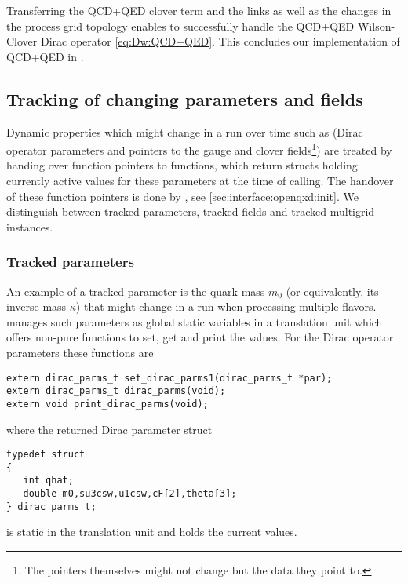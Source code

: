 Transferring the QCD+QED clover term and the  links as well as the changes in the process grid topology enables \quda to successfully handle the QCD+QED Wilson-Clover Dirac operator \cref{eq:Dw:QCD+QED}.
This concludes our implementation of QCD+QED in \quda.

\subsection{Tracking of changing parameters and fields}
\label{sec:interface:track_params}


Dynamic properties which might change in a run over time such as
  (Dirac operator parameters and
  pointers to the gauge and clover fields\footnote{The pointers themselves might not change but the data they point to.})
are treated by handing over function pointers to functions, which return structs holding currently active values for these parameters at the time of calling.
The handover of these function pointers is done by , see \cref{sec:interface:openqxd:init}.
We distinguish between tracked parameters, tracked fields and tracked multigrid instances.

\subsubsection{Tracked parameters}

An example of a tracked parameter is the quark mass $m_0$ (or equivalently, its inverse mass $\kappa$) that might change in a run when processing multiple flavors. \Openqxd manages such parameters as global static variables in a translation unit which offers non-pure functions to set, get and print the values. For the Dirac operator parameters these functions are
\begin{verbatim}
extern dirac_parms_t set_dirac_parms1(dirac_parms_t *par);
extern dirac_parms_t dirac_parms(void);
extern void print_dirac_parms(void);
\end{verbatim}
where the returned Dirac parameter struct
\begin{verbatim}
typedef struct
{
   int qhat;
   double m0,su3csw,u1csw,cF[2],theta[3];
} dirac_parms_t;
\end{verbatim}
is static in the translation unit and holds the current values.

